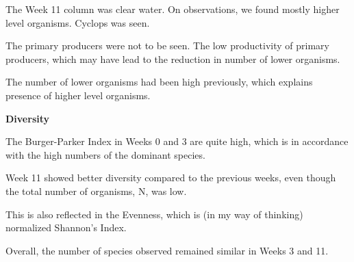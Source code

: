 \documentclass[twocolumn]{article}
\begin{document}
The Week 11 column was clear water. On observations, we found mostly higher level organisms. Cyclops was seen. 

The primary producers were not to be seen. The low productivity of primary producers, which may have lead to the reduction in number of lower organisms.

The number of lower organisms had been high previously, which explains presence of higher level organisms.


\textbf{Diversity}

The Burger-Parker Index in Weeks 0 and 3 are quite high, which is in accordance with the high numbers of the dominant species. 

Week 11 showed better diversity compared to the previous weeks, even though the total number of organisms, N, was low.

This is also reflected in the Evenness, which is (in my way of thinking) normalized Shannon's Index. 

Overall, the number of species observed remained similar in Weeks 3 and 11. 
\end{document}
